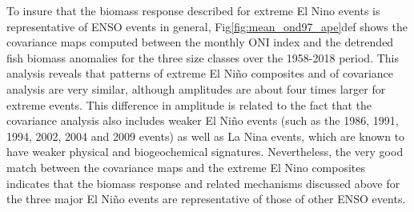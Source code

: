 To insure that the biomass response described for extreme El Nino events is representative of ENSO events in general, Fig\ref{fig:mean_ond97_ape}def shows the covariance maps computed between the monthly ONI index and the detrended fish biomass anomalies for the three size classes over the 1958-2018 period. This analysis reveals that patterns of extreme El Niño composites and of covariance analysis are very similar, although amplitudes are about four times larger for extreme events. This  difference  in amplitude is related to the fact that the covariance analysis also includes weaker El Niño events (such as the 1986, 1991, 1994, 2002, 2004 and 2009 events) as well as La Nina events, which are known to have weaker physical and biogeochemical signatures. Nevertheless, the very good match between the covariance maps and the extreme El Nino composites indicates that the biomass response and related mechanisms discussed above for the three major El Niño events are representative of those of other ENSO events.
